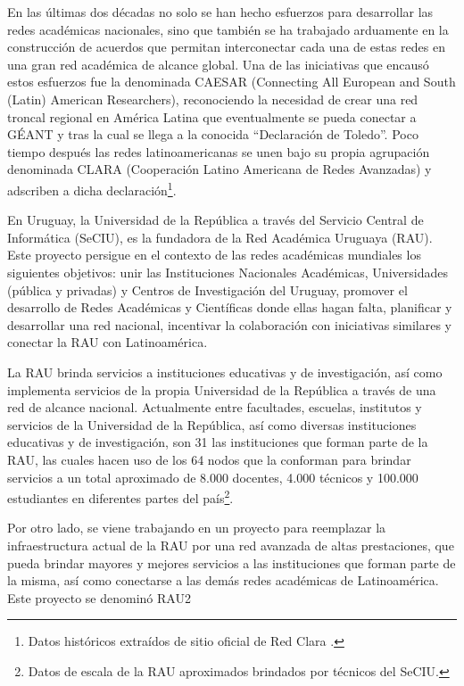 En las \'ultimas dos d\'ecadas no solo se han hecho esfuerzos para desarrollar las redes académicas nacionales, sino que también se ha trabajado arduamente en la construcción de acuerdos que permitan interconectar cada una de estas redes en una gran red académica de alcance global. Una de las iniciativas que encaus\'o estos esfuerzos fue la denominada CAESAR (Connecting All European and South (Latin) American Researchers), reconociendo la necesidad de crear una red troncal regional en América Latina que eventualmente se pueda conectar a GÉANT y tras la cual se llega a la conocida “Declaración de Toledo”. Poco tiempo después las redes latinoamericanas se unen bajo su propia agrupación denominada CLARA (Cooperación Latino Americana de Redes Avanzadas) y adscriben a dicha declaración\footnote{Datos históricos extraídos de sitio oficial de Red Clara \cite{RedClara}.}.

En Uruguay, la Universidad de la República a través del Servicio Central de Informática (SeCIU), es la fundadora de la Red Académica Uruguaya (RAU). Este proyecto persigue en el contexto de las redes académicas mundiales los siguientes objetivos: unir las Instituciones Nacionales Académicas, Universidades (pública y privadas) y Centros de Investigación del Uruguay, promover el desarrollo de Redes Académicas y Científicas donde ellas hagan falta, planificar y desarrollar una red nacional, incentivar la colaboración con iniciativas similares y conectar la RAU con Latinoamérica. 

La RAU brinda servicios a instituciones educativas y de investigación, as\'i como implementa servicios de la propia Universidad de la República a trav\'es de una red de alcance nacional. Actualmente entre facultades, escuelas, institutos y servicios de la Universidad de la República, así como diversas instituciones educativas y de investigación, son 31 las instituciones que forman parte de la RAU, las cuales hacen uso de los 64 nodos que la conforman para brindar servicios a un total aproximado de 8.000 docentes, 4.000 técnicos y 100.000 estudiantes en diferentes partes del país\footnote{Datos de escala de la RAU aproximados brindados por t\'ecnicos del SeCIU.}.

Por otro lado, se viene trabajando en un proyecto para reemplazar la infraestructura actual de la RAU por una red avanzada de altas prestaciones, que pueda brindar mayores y mejores servicios a las instituciones que forman parte de la misma, así como conectarse a las demás redes académicas de Latinoam\'erica. Este proyecto se denomin\'o RAU2  

